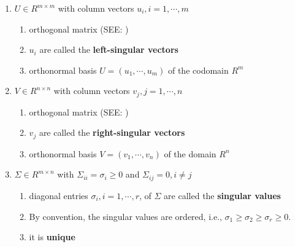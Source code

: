 \begin{enumerate}
    \item $U \in  R^{m\times m}$ with column vectors $u_i, i = 1, \cdots  , m$
    \begin{enumerate}
        \item orthogonal matrix (SEE: )

        \item $u_i$ are called the \textbf{left-singular vectors}

        \item orthonormal basis $U = (u_1, \cdots  ,u_m)$ of the codomain $R^m$
    \end{enumerate}

    \vspace{0.2cm}
    \item $V \in  R^{n\times n}$ with column vectors $v_j, j = 1, \cdots  , n$
    \begin{enumerate}
        \item orthogonal matrix (SEE: )

        \item $v_j$ are called the \textbf{right-singular vectors}

        \item orthonormal basis $V = (v_1, \cdots  , v_n)$ of the domain $R^n$
    \end{enumerate}

    \vspace{0.2cm}
    \item $\Sigma  \in  R^{m\times n}$ with $\Sigma _{ii} = \sigma _i \geq  0$ and $\Sigma _{ij} = 0, i \neq j$
    \begin{enumerate}
        \item diagonal entries $\sigma _i, i = 1, \cdots  , r$, of $\Sigma$  are called the \textbf{singular values}

        \item By convention, the singular values are ordered, i.e., $\sigma _1 \geq  \sigma _2 \geq  \sigma _r \geq  0$.

        \item it is \textbf{unique}


\end{enumerate}
\end{enumerate}
